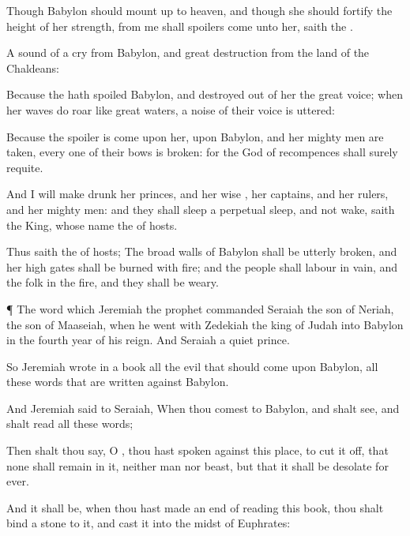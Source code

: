{Though
Babylon should mount
up to
heaven, and though she should
fortify the
height of her
strength,
{} from me shall
spoilers
come unto her,
saith the
{}.

A
sound of a
cry
{} from
Babylon, and
great
destruction from the
land of the
Chaldeans:

Because the
{} hath
spoiled
Babylon, and
destroyed out of her the
great
voice; when her
waves do
roar like
great
waters, a
noise of their
voice is
uttered:

Because the
spoiler is
come upon her,
{} upon
Babylon, and her mighty
men are
taken, every one of their
bows is
broken: for the
{}
God of
recompences shall
surely
requite.

And I will make
drunk her
princes, and her
wise
{}, her
captains, and her
rulers, and her mighty
men: and they shall
sleep a
perpetual
sleep, and not
wake,
saith the
King, whose
name
{} the
{} of
hosts.

Thus
saith the
{} of
hosts; The
broad
walls of
Babylon shall be
utterly
broken, and her
high
gates shall be
burned with
fire; and the
people shall
labour in
vain, and the
folk
in the
fire, and they shall be
weary.


\par }{\PP {}¶ The
word which
Jeremiah the
prophet
commanded
Seraiah the
son of
Neriah, the
son of
Maaseiah, when he
went with
Zedekiah the
king of
Judah into
Babylon in the
fourth
year of his
reign. And
{}
Seraiah
{} a
quiet
prince.

So
Jeremiah
wrote in
a
book all the
evil that should
come upon
Babylon,
{} all these
words that are
written against
Babylon.

And
Jeremiah
said to
Seraiah, When thou
comest to
Babylon, and shalt
see, and shalt
read all these
words;

Then shalt thou
say, O
{}, thou hast
spoken against this
place, to cut it
off, that none shall
remain in it, neither
man nor
beast, but that it shall be
desolate for
ever.

And it shall be, when thou hast made an
end of
reading this
book,
{} thou shalt
bind a
stone to it, and
cast it into the
midst of
Euphrates:

}
